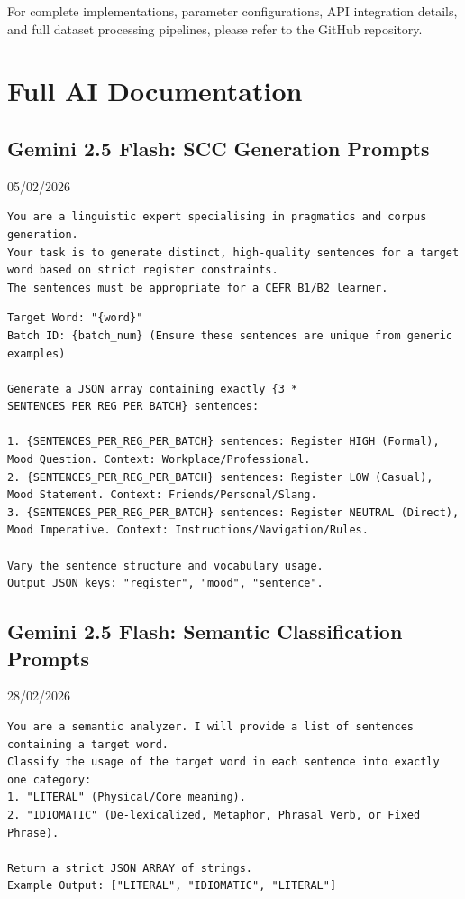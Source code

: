 \documentclass[11pt,a4paper]{article}
\begin{document}
\noindent For complete implementations, parameter configurations, API integration details, and full dataset processing pipelines, please refer to the GitHub repository.

\newpage
\section{Full AI Documentation}\label{sec:full-ai-docs}
\label{sec:appendix-d-prompts}

\subsection{Gemini 2.5 Flash: SCC Generation Prompts}\label{subsec:ai-scc-prompts}
 05/02/2026

\begin{lstlisting}
You are a linguistic expert specialising in pragmatics and corpus generation.
Your task is to generate distinct, high-quality sentences for a target word based on strict register constraints.
The sentences must be appropriate for a CEFR B1/B2 learner.
\end{lstlisting}

\begin{lstlisting}
Target Word: "{word}"
Batch ID: {batch_num} (Ensure these sentences are unique from generic examples)

Generate a JSON array containing exactly {3 * SENTENCES_PER_REG_PER_BATCH} sentences:

1. {SENTENCES_PER_REG_PER_BATCH} sentences: Register HIGH (Formal), Mood Question. Context: Workplace/Professional.
2. {SENTENCES_PER_REG_PER_BATCH} sentences: Register LOW (Casual), Mood Statement. Context: Friends/Personal/Slang.
3. {SENTENCES_PER_REG_PER_BATCH} sentences: Register NEUTRAL (Direct), Mood Imperative. Context: Instructions/Navigation/Rules.

Vary the sentence structure and vocabulary usage.
Output JSON keys: "register", "mood", "sentence".
\end{lstlisting}

\subsection{Gemini 2.5 Flash: Semantic Classification Prompts}\label{subsec:ai-semantic-prompts}
 28/02/2026

\begin{lstlisting}
You are a semantic analyzer. I will provide a list of sentences containing a target word.
Classify the usage of the target word in each sentence into exactly one category:
1. "LITERAL" (Physical/Core meaning).
2. "IDIOMATIC" (De-lexicalized, Metaphor, Phrasal Verb, or Fixed Phrase).

Return a strict JSON ARRAY of strings.
Example Output: ["LITERAL", "IDIOMATIC", "LITERAL"]
\end{lstlisting}
\end{document}
